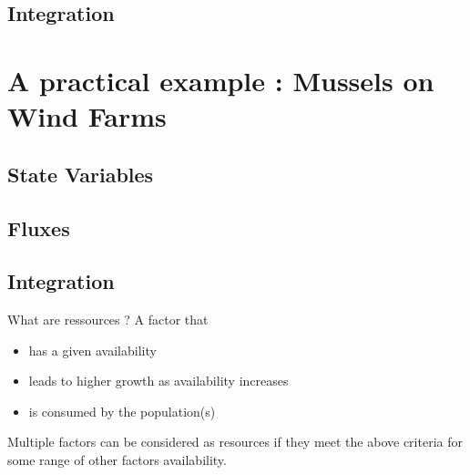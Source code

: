 \documentclass[final,xcolor=dvipsnames]{beamer}
\begin{document}
\subsection{Integration}



\section{A practical example : Mussels on Wind Farms}
\subsection{State Variables}

\subsection{Fluxes}

\subsection{Integration}


\begin{frame}{What are ressources ?}
 A factor that
 \begin{itemize}
 \item has a given availability
 \item leads to higher growth as availability increases
 \item is consumed by the population(s)
 \end{itemize}
 Multiple factors can be considered as resources if they meet the above criteria for some range of other factors availability.
\end{frame}
\end{document}
